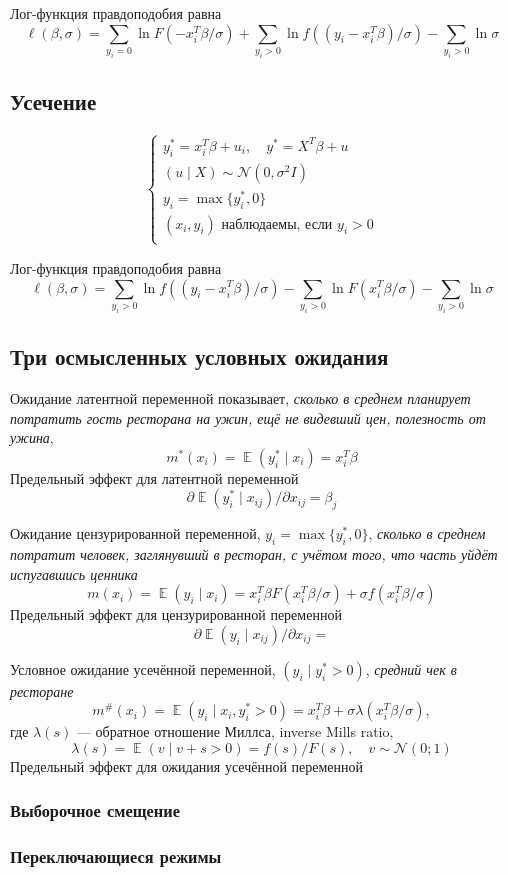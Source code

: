 \documentclass[12pt]{article}
\DeclareMathOperator{\E}{\mathbb{E}}
\newcommand{\cN}{\mathcal{N}}
\begin{document}
Лог-функция правдоподобия равна
\[
\ell(\beta, \sigma) = \sum_{y_i = 0} {\ln F(-x_i^T \beta / \sigma)} + \sum_{y_i > 0} {\ln f((y_i-x_i^T\beta) / \sigma)} - \sum_{y_i > 0} \ln \sigma
\]


\subsection{Усечение}

\[
\begin{cases}
    y_i^* = x_i^T \beta + u_i, \quad y^* = X^T \beta + u \\
    (u \mid X) \sim \cN(0, \sigma^2 I) \\
    y_i = \max\{y_i^*, 0\} \\
    (x_i, y_i) \text{ наблюдаемы, если } y_i > 0 \\
\end{cases}
\]

Лог-функция правдоподобия равна
\[
\ell(\beta, \sigma) = \sum_{y_i > 0} {\ln f((y_i-x_i^T\beta) / \sigma)} - \sum_{y_i > 0}{\ln F(x_i^T \beta / \sigma)} - \sum_{y_i > 0} \ln \sigma
\]


\subsection{Три осмысленных условных ожидания}

Ожидание латентной переменной показывает, \emph{сколько в среднем планирует потратить гость ресторана на ужин, ещё не видевший цен, полезность от ужина},
\[
m^*(x_i) = \E(y^*_i \mid  x_i) = x_i^T \beta
\]
Предельный эффект для латентной переменной 
\[
\partial \E(y^*_i \mid  x_{ij})/ \partial x_{ij} = \beta_j
\]


Ожидание цензурированной переменной, $y_i = \max\{ y_i^*, 0 \}$, \emph{сколько в среднем потратит человек, заглянувший в ресторан, с учётом того, что часть уйдёт испугавшись ценника}
\[
m(x_i) = \E(y_i \mid  x_i) = x_i^T \beta F(x_i^T \beta /\sigma) + \sigma f(x_i^T \beta / \sigma)
\]
Предельный эффект для цензурированной переменной 
\[
\partial \E(y_i \mid  x_{ij})/ \partial x_{ij} = 
\]


Условное ожидание усечённой переменной, $(y_i \mid y_i^* > 0)$, \emph{средний чек в ресторане}
\[
m^\#(x_i) = \E(y_i \mid x_i, y_i^* > 0) = x_i^T \beta  + \sigma \lambda(x_i^T \beta / \sigma),
\]
где $\lambda(s)$ — обратное отношение Миллса, inverse Mills ratio,
\[
\lambda(s) = \E(v \mid v + s > 0) = f(s) / F(s), \quad v\sim \cN(0;1)
\]
Предельный эффект для ожидания усечённой переменной


\subsubsection*{Выборочное смещение}


\subsubsection*{Переключающиеся режимы}
\end{document}
